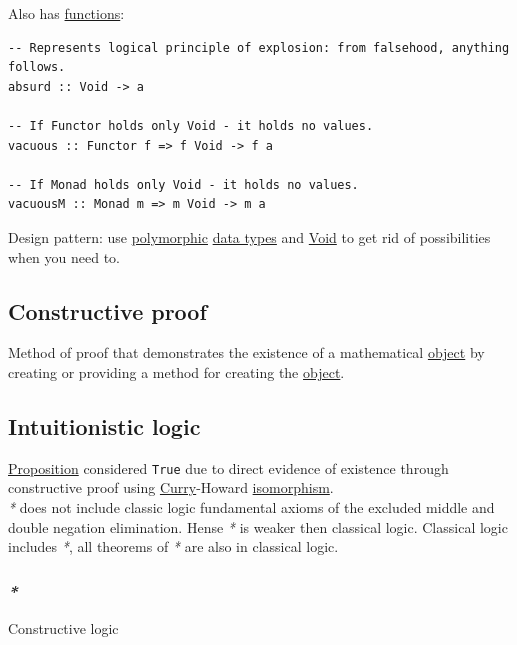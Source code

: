 \documentclass[11pt]{article}
\begin{document}
Also has \hyperref[org66c5288]{functions}:\\
\begin{verbatim}
-- Represents logical principle of explosion: from falsehood, anything follows.
absurd :: Void -> a

-- If Functor holds only Void - it holds no values.
vacuous :: Functor f => f Void -> f a

-- If Monad holds only Void - it holds no values.
vacuousM :: Monad m => m Void -> m a
\end{verbatim}

Design pattern: use \hyperref[org84d7fee]{polymorphic} \hyperref[org88981ee]{data types} and \hyperref[org94d6fd1]{Void} to get rid of possibilities when you need to.\\

\subsection{Constructive proof}
\label{sec:org14ab99b}

Method of proof that demonstrates the existence of a mathematical \hyperref[org025aac8]{object} by creating or providing a method for creating the \hyperref[org025aac8]{object}.\\

\subsection{Intuitionistic logic}
\label{sec:org5067f87}

\hyperref[org78bac32]{Proposition} considered \texttt{True} due to direct evidence of existence through constructive proof using \hyperref[org44f1752]{Curry}-Howard \hyperref[org3db0474]{isomorphism}.\\

\emph{*} does not include classic logic fundamental axioms of the excluded middle and double negation elimination. Hense \emph{*} is weaker then classical logic. Classical logic includes \emph{*}, all theorems of \emph{*} are also in classical logic.\\

\subsubsection{\emph{*}}
\label{sec:org69ed1a2}

\label{org511fe33}Constructive logic\\
\end{document}
